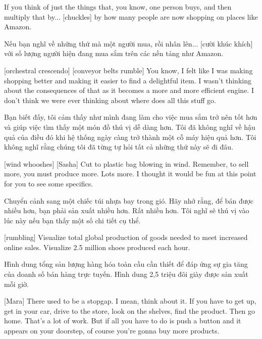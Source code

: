 \documentclass[a4paper]{article}
\begin{document}
	
	If you think of just the things that, you know, one person buys, and then multiply that by... [chuckles] by how many people are now shopping on places like Amazon.
	
	\begin{vietnamese-v2}
		Nếu bạn nghĩ về những thứ mà một người mua, rồi nhân lên... [cười khúc khích] với số lượng người hiện đang mua sắm trên các nền tảng như Amazon.
	\end{vietnamese-v2}
	
	[orchestral crescendo]
	[conveyor belts rumble]
	You know, I felt like I was making shopping better and making it easier to find a delightful item.
	I wasn't thinking about the consequences of that as it becomes a more and more efficient engine.
	I don't think we were ever thinking about where does all this stuff go.
	
	\begin{vietnamese-v2}
		Bạn biết đấy, tôi cảm thấy như mình đang làm cho việc mua sắm trở nên tốt hơn và giúp việc tìm thấy một món đồ thú vị dễ dàng hơn. 
		Tôi đã không nghĩ về hậu quả của điều đó khi hệ thống ngày càng trở thành một cỗ máy hiệu quả hơn. 
		Tôi không nghĩ rằng chúng tôi đã từng tự hỏi tất cả những thứ này sẽ đi đâu.
	\end{vietnamese-v2}
	
	[wind whooshes]
	[Sasha] Cut to plastic bag blowing in wind.
	Remember, to sell more, you must produce more.
	Lots more.
	I thought it would be fun at this point for you to see some specifics.
	
	\begin{vietnamese-v2}
		 Chuyển cảnh sang một chiếc túi nhựa bay trong gió. 
		Hãy nhớ rằng, để bán được nhiều hơn, bạn phải sản xuất nhiều hơn. 
		Rất nhiều hơn. 
		Tôi nghĩ sẽ thú vị vào lúc này nếu bạn thấy một số chi tiết cụ thể.
	\end{vietnamese-v2}
	
	[rumbling]
	Visualize total global production of goods needed to meet increased online sales.
	Visualize 2.5 million shoes produced each hour.
	
	\begin{vietnamese-v2}
		[tiếng ầm ầm] 
		Hình dung tổng sản lượng hàng hóa toàn cầu cần thiết để đáp ứng sự gia tăng của doanh số bán hàng trực tuyến. 
		Hình dung 2,5 triệu đôi giày được sản xuất mỗi giờ.
	\end{vietnamese-v2}
	
	[Mara] There used to be a stopgap. I mean, think about it.
	If you have to get up, get in your car, drive to the store, look on the shelves, find the product.
	Then go home.
	That's a lot of work.
	But if all you have to do is push a button and it appears on your doorstep, of course you're gonna buy more products.
	
\end{document}
